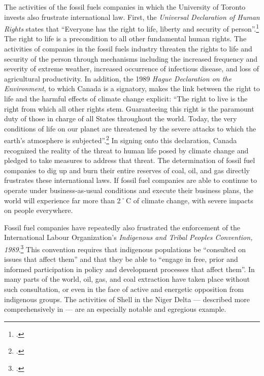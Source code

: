 The activities of the fossil fuels companies in which the University of Toronto invests also frustrate international law.  
First, the \emph{Universal Declaration of Human Rights} states that ``Everyone has the right to life, liberty and security of person''.\footcite[][]{UniversalDeclarationOfHumanRights}
The right to life is a precondition to all other fundamental human rights.  
The activities of companies in the fossil fuels industry threaten the rights to life and security of the person through mechanisms including the increased frequency and severity of extreme weather, increased occurrence of infectious disease, and loss of  agricultural productivity.
In addition, the 1989 \emph{Hague Declaration on the Environment}, to which Canada is a signatory, makes the link between the right to life and the harmful effects of climate change explicit: ``The right to live is the right from which all other rights stem. Guaranteeing this right is the paramount duty of those in charge of all States throughout the world.  Today, the very conditions of life on our planet are threatened by the severe attacks to which the earth's atmosphere is subjected''.\footcite[][]{HagueDeclarationOnTheEnvironment}   
In signing onto this declaration, Canada recognized the reality of the threat to human life posed by climate change and pledged to take measures to address that threat.
The determination of fossil fuel companies to dig up and burn their entire reserves of coal, oil, and gas directly frustrates these international laws.
If fossil fuel companies are able to continue to operate under business-as-usual conditions and execute their business plans, the world will experience far more than 2˚C of climate change, with severe impacts on people everywhere.



Fossil fuel companies have repeatedly also frustrated the enforcement of the International Labour Organization's \emph{Indigenous and Tribal Peoples Convention, 1989}.\footcite[][]{ILOConv169}
This convention requires that indigenous populations be ``consulted on issues that affect them'' and that they be able to ``engage in free, prior and informed participation in policy and development processes that affect them''.
In many parts of the world, oil, gas, and coal extraction have taken place without such consultation, or even in the face of active and energetic opposition from indigenous groups.
The activities of Shell in the Niger Delta --- described more comprehensively in  --- are an especially notable and egregious example.



